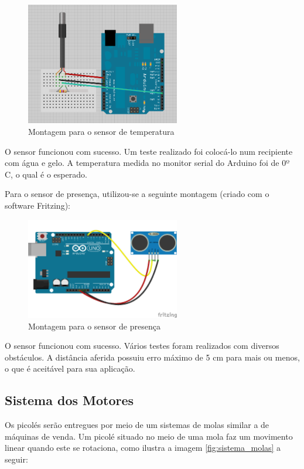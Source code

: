 \begin{figure}[H]
	\centering
    \includegraphics[width=0.6\textwidth]{figuras/fritzing_temp}
    \caption{Montagem para o sensor de temperatura}
    \label{fig:fritzing_temp}
\end{figure}

O sensor funcionou com sucesso. Um teste realizado foi colocá-lo num recipiente com água e gelo. A temperatura medida no monitor serial do Arduino foi de 0º C, o qual é o esperado.

Para o sensor de presença, utilizou-se a seguinte montagem (criado com o software Fritzing):

\begin{figure}[H]
	\centering
    \includegraphics[width=0.6\textwidth]{figuras/fritzing_presenca}
    \caption{Montagem para o sensor de presença}
    \label{fig:fritzing_presenca}
\end{figure}

O sensor funcionou com sucesso. Vários testes foram realizados com diversos obstáculos. A distância aferida possuiu erro máximo de 5 cm para mais ou menos, o que é aceitável para sua aplicação.

\newpage
\subsection{Sistema dos Motores}
Os picolés serão entregues por meio de um sistemas de molas similar a de máquinas de venda. Um picolé situado no meio de uma mola faz um movimento linear quando este se rotaciona, como ilustra a imagem \ref{fig:sistema_molas} a seguir:

